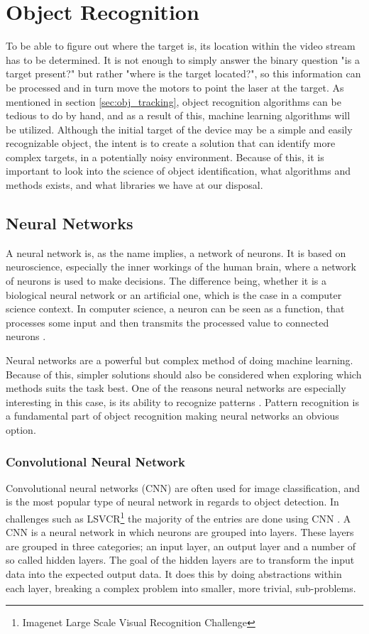 \section{Object Recognition}
To be able to figure out where the target is, its location within the video stream has to be determined.
It is not enough to simply answer the binary question "is a target present?" but rather "where is the target located?", so this information can be processed and in turn move the motors to point the laser at the target.
As mentioned in section \ref{sec:obj_tracking}, object recognition algorithms can be tedious to do by hand, and as a result of this, machine learning algorithms will be utilized.
Although the initial target of the device may be a simple and easily recognizable object, the intent is to create a solution that can identify more complex targets, in a potentially noisy environment.
Because of this, it is important to look into the science of object identification, what algorithms and methods exists, and what libraries we have at our disposal.

\subsection{Neural Networks}

A neural network is, as the name implies, a network of neurons.
It is based on neuroscience, especially the inner workings of the human brain, where a network of neurons is used to make decisions.
The difference being, whether it is a biological neural network or an artificial one, which is the case in a computer science context.
In computer science, a neuron can be seen as a function, that processes some input and then transmits the processed value to connected neurons \cite{ANN}.

Neural networks are a powerful but complex method of doing machine learning.
Because of this, simpler solutions should also be considered when exploring which methods suits the task best.
One of the reasons neural networks are especially interesting in this case, is its ability to recognize patterns \cite{ANN}.
Pattern recognition is a fundamental part of object recognition making neural networks an obvious option.


\subsubsection{Convolutional Neural Network}
Convolutional neural networks (CNN) are often used for image classification, and is the most popular type of neural network in regards to object detection\cite{CNN}.
In challenges such as LSVCR\footnote{Imagenet Large Scale Visual Recognition Challenge} the majority of the entries are done using CNN \cite{ILSVRC_Results}.  
A CNN is a neural network in which neurons are grouped into layers.
These layers are grouped in three categories; an input layer, an output layer and a number of so called hidden layers.
The goal of the hidden layers are to transform the input data into the expected output data.
It does this by doing abstractions within each layer, breaking a complex problem into smaller, more trivial, sub-problems.

